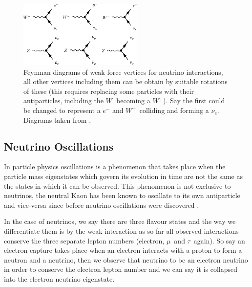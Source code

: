 \documentclass[a4paper,12pt]{article}
\newcommand{\Mu}{$\mu$}
\newcommand{\Tau}{$\tau$}
\newcommand{\Ne}{$\nu_e$}
\newcommand{\Wp}{$W^+$}
\newcommand{\Wm}{$W^-$}
\begin{document}
\begin{figure}[H]
    \centering
    \includegraphics[width=0.55\textwidth]{figures/NeutrinoFeynman.pdf}
    \caption{
        Feynman diagrams of weak force vertices for neutrino interactions, all other vertices including them can be obtain by suitable rotations of these
        (this requires replacing some particles with their antiparticles, including the \Wm becoming a \Wp).
        Say the first could be changed to represent a $e^-$ and \Wp\ colliding and forming a \Ne.
        Diagrams taken from \cite{potterFeynmanDiagramsParticlea}.
    }\label{fig:nu_feyn}
\end{figure}

\subsection{Neutrino Oscillations}
In particle physics oscillations is a phenomenon that takes place when the particle mass eigenstates which govern its evolution in time are not the same as the states in which it can be observed.
This phenomenon is not exclusive to neutrinos, the neutral Kaon has been known to oscillate to its own antiparticle and vice-versa since before neutrino oscillations were discovered \cite{burkhardtWavelengthNeutrinoNeutral2003}.

In the case of neutrinos, we say there are three flavour states and the way we differentiate them is by the weak interaction as so far all observed interactions conserve the three separate lepton numbers (electron, \Mu\ and \Tau\ again).
So say an electron capture takes place when an electron interacts with a proton to form a neutron and a neutrino, then we observe that neutrino to be an electron neutrino in order to conserve the electron lepton number and we can say it is collapsed into the electron neutrino eigenstate.
\end{document}
